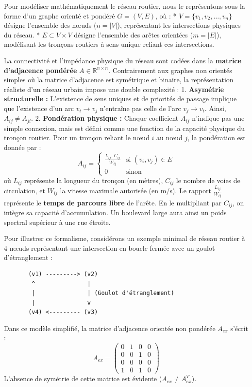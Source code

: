 \documentclass[10pt, a4paper]{article}
\begin{document}
Pour modéliser mathématiquement le réseau routier, nous le représentons
sous la forme d'un graphe orienté et pondéré \(G = (V, E)\), où : *
\(V = \{v_1, v_2, \dots, v_n\}\) désigne l'ensemble des nœuds
(\(n = |V|\)), représentant les intersections physiques du réseau. *
\(E \subset V \times V\) désigne l'ensemble des arêtes orientées
(\(m = |E|\)), modélisant les tronçons routiers à sens unique reliant
ces intersections.

La connectivité et l'impédance physique du réseau sont codées dans la
\textbf{matrice d'adjacence pondérée} \(A \in \mathbb{R}^{n \times n}\).
Contrairement aux graphes non orientés simples où la matrice d'adjacence
est symétrique et binaire, la représentation réaliste d'un réseau urbain
impose une double complexité : 1. \textbf{Asymétrie structurelle :}
L'existence de sens uniques et de priorités de passage implique que
l'existence d'un arc \(v_i \to v_j\) n'entraîne pas celle de l'arc
\(v_j \to v_i\). Ainsi, \(A_{ij} \neq A_{ji}\). 2. \textbf{Pondération
physique :} Chaque coefficient \(A_{ij}\) n'indique pas une simple
connexion, mais est défini comme une fonction de la capacité physique du
tronçon routier. Pour un tronçon reliant le nœud \(i\) au nœud \(j\), la
pondération est donnée par :
\[A_{ij} = \begin{cases} \frac{L_{ij} \cdot C_{ij}}{W_{ij}} & \text{si } (v_i, v_j) \in E \\ 0 & \text{sinon} \end{cases}\]
où \(L_{ij}\) représente la longueur du tronçon (en mètres), \(C_{ij}\)
le nombre de voies de circulation, et \(W_{ij}\) la vitesse maximale
autorisée (en m/s). Le rapport \(\frac{L_{ij}}{W_{ij}}\) représente le
\textbf{temps de parcours libre} de l'arête. En le multipliant par
\(C_{ij}\), on intègre sa capacité d'accumulation. Un boulevard large
aura ainsi un poids spectral supérieur à une rue étroite.

Pour illustrer ce formalisme, considérons un exemple minimal de réseau
routier à 4 nœuds représentant une intersection en boucle fermée avec un
goulot d'étranglement :

\begin{verbatim}
       (v1) ---------> (v2)
        ^               |
        |               | (Goulot d'étranglement)
        |               v
       (v4) <--------- (v3)
\end{verbatim}

Dans ce modèle simplifié, la matrice d'adjacence orientée non pondérée
\(A_{ex}\) s'écrit : \[A_{ex} = \begin{pmatrix}
0 & 1 & 0 & 0 \\
0 & 0 & 1 & 0 \\
0 & 0 & 0 & 0 \\
1 & 0 & 1 & 0
\end{pmatrix}\] L'absence de symétrie de cette matrice est évidente
(\(A_{ex} \neq A_{ex}^T\)).
\end{document}
